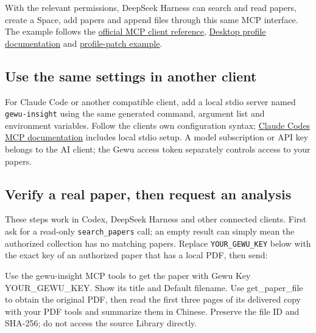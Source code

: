 \documentclass[10pt,letterpaper,oneside]{scrreprt}
\renewenvironment{quote}
  {\Needspace{5\baselineskip}\begin{tcolorbox}[enhanced,breakable,colback=GewuPale,colframe=GewuPale,boxrule=0pt,
    borderline west={1.6pt}{0pt}{GewuBlue},arc=1.2mm,left=2.5mm,right=2.5mm,top=1.7mm,bottom=1.7mm,
    before skip=4pt,after skip=5pt,fontupper=\color{GewuInk}\small]}
  {\end{tcolorbox}}
\begin{document}
With the relevant permissions, DeepSeek Harness can search and read papers, create a Space, add papers and append files through this same MCP interface. The example follows the \href{https://github.com/deepseek-ai/deepseek-harness/blob/master/packages/mcp/mcp-client/README.md}{official MCP client reference}, \href{https://github.com/deepseek-ai/deepseek-harness/blob/master/apps/desktop/README.md}{Desktop profile documentation} and \href{https://github.com/deepseek-ai/deepseek-harness/blob/master/apps/cli/config/examples/mcp-memory/mcp-reference-memory.cordis.yml}{profile-patch example}.

\subsection{Use the same settings in another client}\label{use-the-same-settings-in-another-client}

For Claude Code or another compatible client, add a local stdio server named \texttt{gewu-insight} using the same generated command, argument list and environment variables. Follow the client\textquotesingle s own configuration syntax; \href{https://code.claude.com/docs/en/mcp}{Claude Code\textquotesingle s MCP documentation} includes local stdio setup. A model subscription or API key belongs to the AI client; the Gewu access token separately controls access to your papers.

\subsection{Verify a real paper, then request an analysis}\label{verify-a-real-paper-then-request-an-analysis}

These steps work in Codex, DeepSeek Harness and other connected clients. First ask for a read-only \texttt{search\_papers} call; an empty result can simply mean the authorized collection has no matching papers. Replace \texttt{YOUR\_GEWU\_KEY} below with the exact key of an authorized paper that has a local PDF, then send:

\begin{quote}
Use the gewu-insight MCP tools to get the paper with Gewu Key YOUR\_GEWU\_KEY. Show its title and Default filename. Use get\_paper\_file to obtain the original PDF, then read the first three pages of its delivered copy with your PDF tools and summarize them in Chinese. Preserve the file ID and SHA-256; do not access the source Library directly.
\end{quote}
\end{document}
